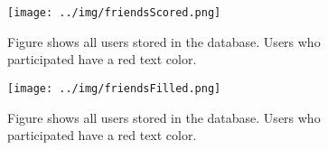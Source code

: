 \documentclass[preprint,12pt]{elsarticle}
\begin{document}

\begin{figure}
  \texttt{[image: ../img/friendsScored.png]}
\caption{Figure shows all users stored in the database. Users who
  participated have a red text color.}
\label{fig:friendsScored}
\end{figure}

\begin{figure}
  \texttt{[image: ../img/friendsFilled.png]}
\caption{Figure shows all users stored in the database. Users who
  participated have a red text color.}
\label{fig:friendsFilled}
\end{figure}
\end{document}
